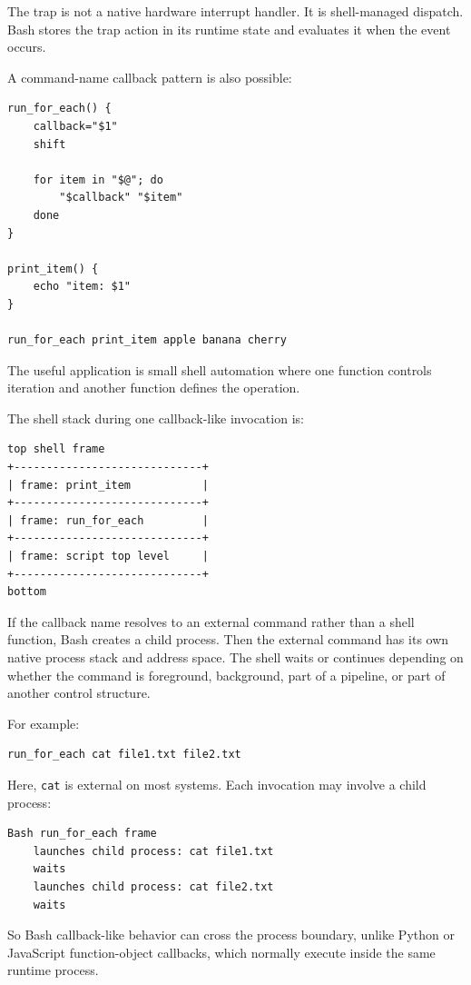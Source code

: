 The trap is not a native hardware interrupt handler. It is shell-managed dispatch. Bash stores the trap action in its runtime state and evaluates it when the event occurs.

A command-name callback pattern is also possible:

\begin{verbatim}
run_for_each() {
    callback="$1"
    shift

    for item in "$@"; do
        "$callback" "$item"
    done
}

print_item() {
    echo "item: $1"
}

run_for_each print_item apple banana cherry
\end{verbatim}

The useful application is small shell automation where one function controls iteration and another function defines the operation.

The shell stack during one callback-like invocation is:

\begin{verbatim}
top shell frame
+-----------------------------+
| frame: print_item           |
+-----------------------------+
| frame: run_for_each         |
+-----------------------------+
| frame: script top level     |
+-----------------------------+
bottom
\end{verbatim}

If the callback name resolves to an external command rather than a shell function, Bash creates a child process. Then the external command has its own native process stack and address space. The shell waits or continues depending on whether the command is foreground, background, part of a pipeline, or part of another control structure.

For example:

\begin{verbatim}
run_for_each cat file1.txt file2.txt
\end{verbatim}

Here, \texttt{cat} is external on most systems. Each invocation may involve a child process:

\begin{verbatim}
Bash run_for_each frame
    launches child process: cat file1.txt
    waits
    launches child process: cat file2.txt
    waits
\end{verbatim}

So Bash callback-like behavior can cross the process boundary, unlike Python or JavaScript function-object callbacks, which normally execute inside the same runtime process.

